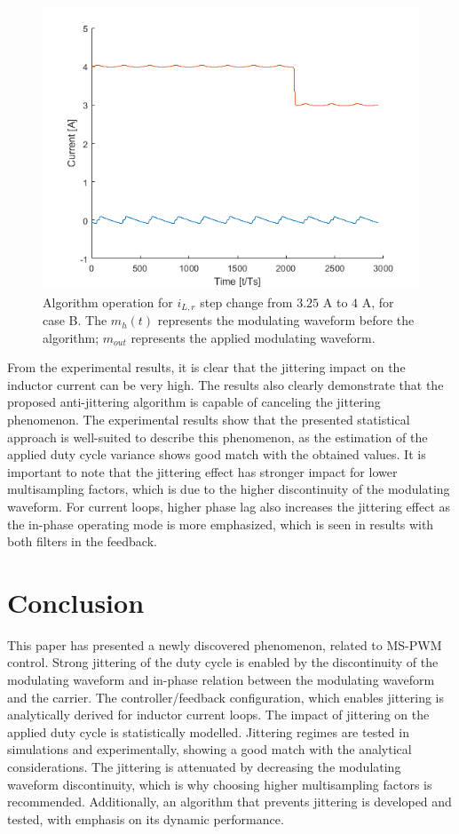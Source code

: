 \documentclass[journal]{IEEEtran}
\begin{document}
\begin{figure}[t!]
    \centerline{\includegraphics[width=0.95\linewidth]{figures/nasDif_step_50Hz.png}}
    \caption{Algorithm operation for $i_{L,r}$ step change from $3.25$ A to $4$ A, for case B. The $m_h(t)$ represents the modulating waveform before the algorithm; $m_{out}$ represents the applied modulating waveform.}
	\label{fig:adaptive_algo}
\end{figure}

From the experimental results, it is clear that the jittering impact on the inductor current can be very high. The results also clearly demonstrate that the proposed anti-jittering algorithm is capable of canceling the jittering phenomenon. The experimental results show that the presented statistical approach is well-suited to describe this phenomenon, as the estimation of the applied duty cycle variance shows good match with the obtained values. It is important to note that the jittering effect has stronger impact for lower multisampling factors, which is due to the higher discontinuity of the modulating waveform. For current loops, higher phase lag also increases the jittering effect as the in-phase operating mode is more emphasized, which is seen in results with both filters in the feedback.


\section{Conclusion}
This paper has presented a newly discovered phenomenon, related to MS-PWM control. Strong jittering of the duty cycle is enabled by the discontinuity of the modulating waveform and in-phase relation between the modulating waveform and the carrier. The controller/feedback configuration, which enables jittering is analytically derived for inductor current loops. The impact of jittering on the applied duty cycle is statistically modelled. Jittering regimes are tested in simulations and experimentally, showing a good match with the analytical considerations.
The jittering is attenuated by decreasing the modulating waveform discontinuity, which is why choosing higher multisampling factors is recommended. Additionally, an algorithm that prevents jittering is developed and tested, with emphasis on its dynamic performance. 

\ifCLASSOPTIONcaptionsoff
  \newpage
\fi



\end{document}
